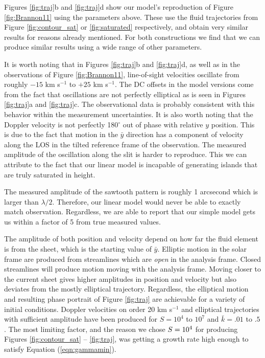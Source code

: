 Figures \ref{fig:traj}b and \ref{fig:traj}d show our model's reproduction of Figure \ref{fig:Brannon11} using the parameters above. These use the fluid trajectories from Figure \ref{fig:contour_sat} or \ref{fig:saturated} respectively, and obtain very similar results for reasons already mentioned.  For both constructions we find that we can produce similar results using a wide range of other parameters.  

It is worth noting that in Figures \ref{fig:traj}b and \ref{fig:traj}d, as well as in the observations of Figure \ref{fig:Brannon11}, line-of-sight velocities oscillate from roughly $-15$ km s$^{-1}$ to $+25$ km s$^{-1}$.  The DC offsets in the model versions come from the fact that oscillations are not perfectly elliptical as is seen in Figures \ref{fig:traj}a and \ref{fig:traj}c.  The observational data is probably consistent with this behavior within the measurement uncertainties. It is also worth noting that the Doppler velocity is not perfectly 180$^{\circ}$ out of phase with relative $y$ position.  This is due to the fact that motion in the $\bar{y}$ direction has a component of velocity along the LOS in the tilted reference frame of the observation. The measured amplitude of the oscillation along the slit is harder to reproduce.  This we can attribute to the fact that our linear model is incapable of generating islands that are truly saturated in height.  

The measured amplitude of the sawtooth pattern is roughly 1 arcsecond which is larger than $\lambda /2$.  Therefore, our linear model would never be able to exactly match observation.  Regardless, we are able to report that our simple model gets us within a factor of 5 from true measured values.  
	
	The amplitude of both position and velocity depend on how far the fluid element is from the sheet, which is the starting value of $\bar{y}$.  Elliptic motion in the solar frame are produced from streamlines which are {\em open} in the analysis frame.  Closed streamlines will produce motion moving with the analysis frame. Moving closer to the current sheet gives higher amplitudes in position and velocity but also deviates from the mostly elliptical trajectory. Regardless, the elliptical motion and resulting phase portrait of Figure \ref{fig:traj} are achievable for a variety of initial conditions. Doppler velocities on order 20 km s$^{-1}$ and elliptical trajectories with sufficient amplitude have been produced for $S = 10^4$ to $10^7$ and $\bar{k} = .01$ to $.5$.  The most limiting factor, and the reason we chose $S = 10^4$ for producing Figures \ref{fig:contour_sat} -- \ref{fig:traj}, was getting a growth rate high enough to satisfy Equation (\ref{eqn:gammamin}).

